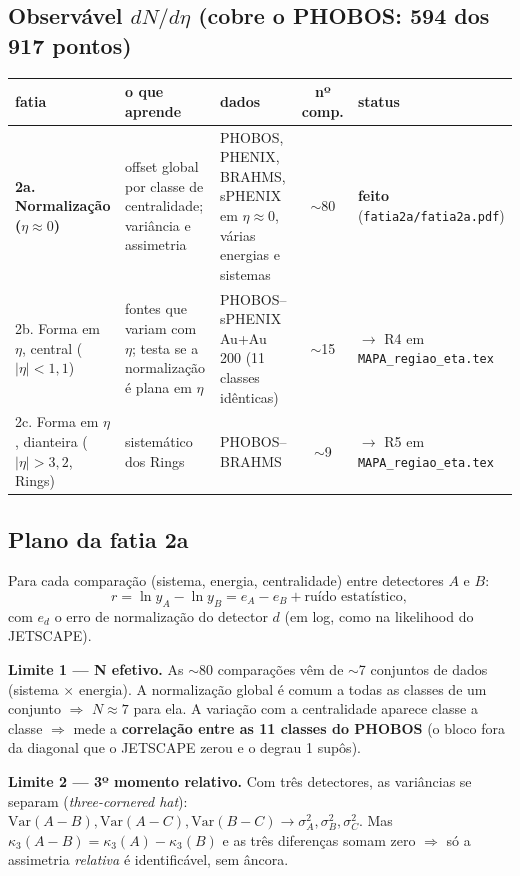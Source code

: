 \documentclass[11pt,a4paper]{article}
\newcommand{\feito}{\textcolor{green!45!black}{\textbf{feito}}}
\newcommand{\arq}[1]{\texttt{\nolinkurl{#1}}}
\begin{document}
\subsection*{Observável $dN/d\eta$ (cobre o PHOBOS: 594 dos 917 pontos)}
\begin{tabularx}{\linewidth}{@{}l Y Y c l@{}}
\toprule
fatia & o que aprende & dados & nº comp. & status \\
\midrule
\textbf{2a. Normalização ($\eta\approx0$)} & offset global por classe de centralidade; variância e assimetria & PHOBOS, PHENIX, BRAHMS, sPHENIX em $\eta\approx0$, várias energias e sistemas & $\sim$80 & \feito{} (\arq{fatia2a/fatia2a.pdf}) \\
2b. Forma em $\eta$, central ($|\eta|<1{,}1$) & fontes que variam com $\eta$; testa se a normalização é plana em $\eta$ & PHOBOS--sPHENIX Au+Au 200 (11 classes idênticas) & $\sim$15 & $\to$ R4 em \arq{MAPA_regiao_eta.tex} \\
2c. Forma em $\eta$, dianteira ($|\eta|>3{,}2$, Rings) & sistemático dos Rings & PHOBOS--BRAHMS & $\sim$9 & $\to$ R5 em \arq{MAPA_regiao_eta.tex} \\
\bottomrule
\end{tabularx}

\subsection*{Plano da fatia 2a}
Para cada comparação (sistema, energia, centralidade) entre detectores $A$ e $B$:
\[
r = \ln y_A - \ln y_B = e_A - e_B + \text{ruído estatístico},
\]
com $e_d$ o erro de normalização do detector $d$ (em log, como na likelihood do JETSCAPE).

\textbf{Limite 1 --- N efetivo.} As $\sim$80 comparações vêm de $\sim$7 conjuntos de dados (sistema $\times$ energia).
A normalização global é comum a todas as classes de um conjunto $\Rightarrow$ $N\approx7$ para ela.
A variação com a centralidade aparece classe a classe $\Rightarrow$ mede a \textbf{correlação entre as 11 classes do PHOBOS}
(o bloco fora da diagonal que o JETSCAPE zerou e o degrau 1 supôs).

\textbf{Limite 2 --- 3º momento relativo.} Com três detectores, as variâncias se separam (\emph{three-cornered hat}):
$\mathrm{Var}(A-B),\mathrm{Var}(A-C),\mathrm{Var}(B-C)\to\sigma_A^2,\sigma_B^2,\sigma_C^2$.
Mas $\kappa_3(A-B)=\kappa_3(A)-\kappa_3(B)$ e as três diferenças somam zero $\Rightarrow$ só a assimetria \emph{relativa} é identificável, sem âncora.
\end{document}
